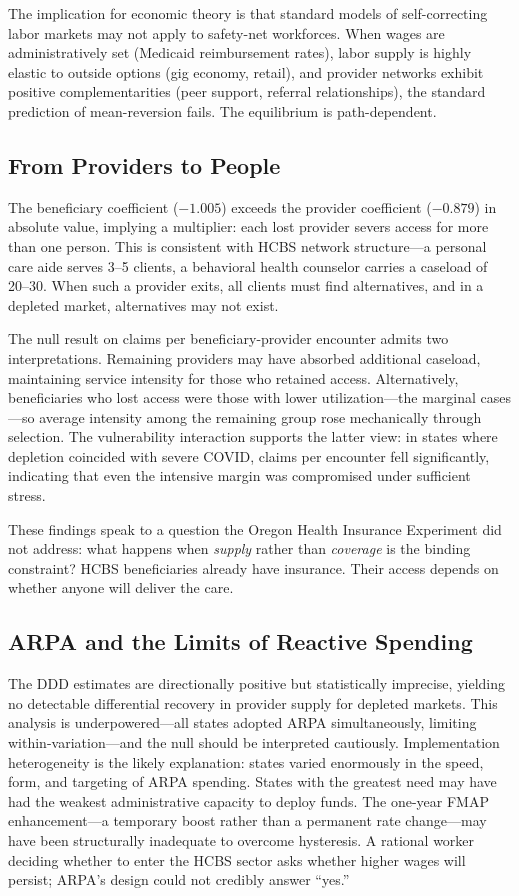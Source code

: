 \documentclass[12pt]{article}
\begin{document}
The implication for economic theory is that standard models of self-correcting labor markets may not apply to safety-net workforces. When wages are administratively set (Medicaid reimbursement rates), labor supply is highly elastic to outside options (gig economy, retail), and provider networks exhibit positive complementarities (peer support, referral relationships), the standard prediction of mean-reversion fails. The equilibrium is path-dependent.

\subsection{From Providers to People}

The beneficiary coefficient ($-1.005$) exceeds the provider coefficient ($-0.879$) in absolute value, implying a multiplier: each lost provider severs access for more than one person. This is consistent with HCBS network structure---a personal care aide serves 3--5 clients, a behavioral health counselor carries a caseload of 20--30. When such a provider exits, all clients must find alternatives, and in a depleted market, alternatives may not exist.

The null result on claims per beneficiary-provider encounter admits two interpretations. Remaining providers may have absorbed additional caseload, maintaining service intensity for those who retained access. Alternatively, beneficiaries who lost access were those with lower utilization---the marginal cases---so average intensity among the remaining group rose mechanically through selection. The vulnerability interaction supports the latter view: in states where depletion coincided with severe COVID, claims per encounter fell significantly, indicating that even the intensive margin was compromised under sufficient stress.

These findings speak to a question the Oregon Health Insurance Experiment \citep{finkelstein2012,baicker2013} did not address: what happens when \emph{supply} rather than \emph{coverage} is the binding constraint? HCBS beneficiaries already have insurance. Their access depends on whether anyone will deliver the care.

\subsection{ARPA and the Limits of Reactive Spending}

The DDD estimates are directionally positive but statistically imprecise, yielding no detectable differential recovery in provider supply for depleted markets. This analysis is underpowered---all states adopted ARPA simultaneously, limiting within-variation---and the null should be interpreted cautiously. Implementation heterogeneity is the likely explanation: states varied enormously in the speed, form, and targeting of ARPA spending. States with the greatest need may have had the weakest administrative capacity to deploy funds. The one-year FMAP enhancement---a temporary boost rather than a permanent rate change---may have been structurally inadequate to overcome hysteresis. A rational worker deciding whether to enter the HCBS sector asks whether higher wages will persist; ARPA's design could not credibly answer ``yes.''
\end{document}
